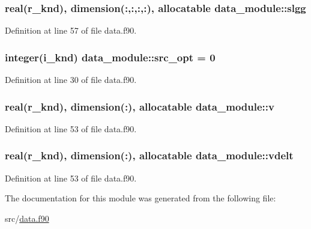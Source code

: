\hypertarget{classdata__module_a28dc2858f4b2054a06645430e7292d2a}{
\subsubsection[{slgg}]{\setlength{\rightskip}{0pt plus 5cm}real(r\-\_\-knd), dimension(\-:,\-:,\-:,\-:), allocatable data\-\_\-module\-::slgg}}\label{classdata__module_a28dc2858f4b2054a06645430e7292d2a}


Definition at line 57 of file data.\-f90.

\hypertarget{classdata__module_aa630a65ce606a2869f55b214eeb6d9ec}{
\subsubsection[{src\-\_\-opt}]{\setlength{\rightskip}{0pt plus 5cm}integer(i\-\_\-knd) data\-\_\-module\-::src\-\_\-opt = 0}}\label{classdata__module_aa630a65ce606a2869f55b214eeb6d9ec}


Definition at line 30 of file data.\-f90.

\hypertarget{classdata__module_a61d334d68509b4d5fac687707ac83241}{
\subsubsection[{v}]{\setlength{\rightskip}{0pt plus 5cm}real(r\-\_\-knd), dimension(\-:), allocatable data\-\_\-module\-::v}}\label{classdata__module_a61d334d68509b4d5fac687707ac83241}


Definition at line 53 of file data.\-f90.

\hypertarget{classdata__module_a8df0533fb95046e281a489f1c5dc9030}{
\subsubsection[{vdelt}]{\setlength{\rightskip}{0pt plus 5cm}real(r\-\_\-knd), dimension(\-:), allocatable data\-\_\-module\-::vdelt}}\label{classdata__module_a8df0533fb95046e281a489f1c5dc9030}


Definition at line 53 of file data.\-f90.



The documentation for this module was generated from the following file\-:\begin{DoxyCompactItemize}
\item 
src/\hyperlink{data_8f90}{data.\-f90}\end{DoxyCompactItemize}
